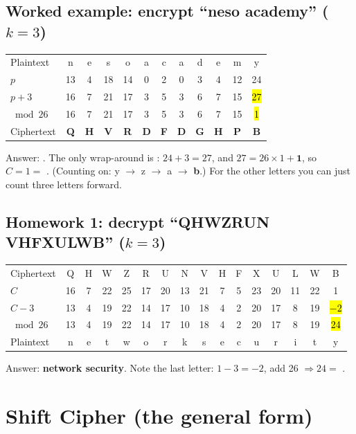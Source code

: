 \subsection{Worked example: encrypt ``neso academy'' ($k=3$)}
\begin{center}\small\setlength{\tabcolsep}{5pt}
\begin{tabular}{@{}l*{4}{c}|*{7}{c}@{}}
\toprule
Plaintext & n&e&s&o & a&c&a&d&e&m&y\\
$p$ & 13&4&18&14 & 0&2&0&3&4&12&24\\
$p+3$ & 16&7&21&17 & 3&5&3&6&7&15&\hl{27}\\
$\bmod 26$ & 16&7&21&17 & 3&5&3&6&7&15&\hl{1}\\
Ciphertext & \textbf{Q}&\textbf{H}&\textbf{V}&\textbf{R} & \textbf{D}&\textbf{F}&\textbf{D}&\textbf{G}&\textbf{H}&\textbf{P}&\textbf{B}\\
\bottomrule
\end{tabular}
\end{center}
Answer: \textbf{}.
The only wrap-around is : $24+3 = 27$, and $27 = 26\times 1 + \mathbf{1}$, so $C = 1 = $ .
(Counting on: y $\to$ z $\to$ a $\to$ \textbf{b}.) For the other letters you can just count three letters forward.

\subsection{Homework 1: decrypt ``QHWZRUN VHFXULWB'' ($k=3$)}
\begin{center}\small\setlength{\tabcolsep}{3.6pt}
\begin{tabular}{@{}l*{7}{c}|*{8}{c}@{}}
\toprule
Ciphertext & Q&H&W&Z&R&U&N & V&H&F&X&U&L&W&B\\
$C$ & 16&7&22&25&17&20&13 & 21&7&5&23&20&11&22&1\\
$C-3$ & 13&4&19&22&14&17&10 & 18&4&2&20&17&8&19&\hl{$-2$}\\
$\bmod 26$ & 13&4&19&22&14&17&10 & 18&4&2&20&17&8&19&\hl{24}\\
Plaintext & n&e&t&w&o&r&k & s&e&c&u&r&i&t&y\\
\bottomrule
\end{tabular}
\end{center}
Answer: \textbf{network security}. Note the last letter: $1-3=-2$, add 26 $\Rightarrow 24 =$ .

\section{Shift Cipher (the general form)}

